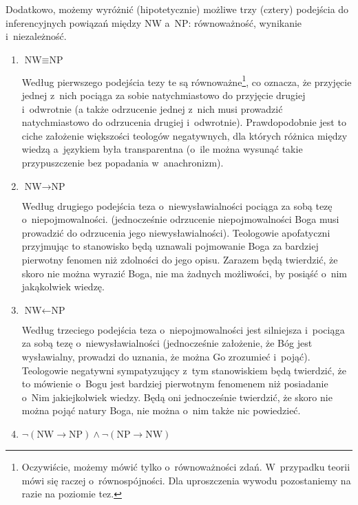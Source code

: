 Dodatkowo, możemy wyróżnić (hipotetycznie) możliwe trzy (cztery) podejścia do inferencyjnych powiązań między NW a~NP: równoważność, wynikanie i~niezależność.

\begin{enumerate}[label = \arabic*), itemindent=6mm, labelwidth=4mm, labelsep=2mm, itemsep=1em, leftmargin=0mm]
\item $\text{NW} \equiv \text{NP}$

Według pierwszego podejścia tezy te są równoważne\footnote{Oczywiście, możemy mówić tylko o~równoważności zdań. W~przypadku teorii mówi się raczej o~równospójności. Dla uproszczenia wywodu pozostaniemy na razie na poziomie tez.}, co oznacza, że przyjęcie jednej z~nich pociąga za sobie natychmiastowo do przyjęcie drugiej i~odwrotnie (a także odrzucenie jednej z~nich musi prowadzić natychmiastowo do odrzucenia drugiej i~odwrotnie). Prawdopodobnie jest to ciche założenie większości teologów negatywnych, dla których różnica między wiedzą a~językiem była transparentna (o~ile można wysunąć takie przypuszczenie bez popadania w~anachronizm).

\item $\text{NW} \rightarrow \text{NP}$

Według drugiego podejścia teza o~niewysławialności pociąga za sobą tezę o~niepojmowalności. (jednocześnie odrzucenie niepojmowalności Boga musi prowadzić do odrzucenia jego niewysławialności). Teologowie apofatyczni przyjmując to stanowisko będą uznawali pojmowanie Boga za bardziej pierwotny fenomen niż zdolności do jego opisu. Zarazem będą twierdzić, że skoro nie można wyrazić Boga, nie ma żadnych możliwości, by posiąść o~nim jakąkolwiek wiedzę.

\item $\text{NW} \leftarrow \text{NP}$

Według trzeciego podejścia teza o~niepojmowalności jest silniejsza i~pociąga za sobą tezę o~niewysławialności (jednocześnie założenie, że Bóg jest wysławialny, prowadzi do uznania, że można Go zrozumieć i~pojąć). Teologowie negatywni sympatyzujący z~tym stanowiskiem będą twierdzić, że to mówienie o~Bogu jest bardziej pierwotnym fenomenem niż posiadanie o~Nim jakiejkolwiek wiedzy. Będą oni jednocześnie twierdzić, że skoro nie można pojąć natury Boga, nie można o~nim także nic powiedzieć.

\item $\neg (\text{NW} \rightarrow \text{NP}) \land \neg (\text{NP} \rightarrow \text{NW})$


\end{enumerate}

